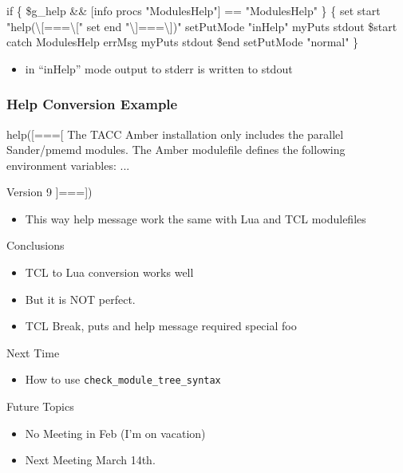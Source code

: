 \documentclass{beamer}
\begin{document}
\begin{frame}[fragile]
    \frametitle{}
 {\tiny
    \begin{semiverbatim}
  if \{ \$g\_help && [info procs "ModulesHelp"] == "ModulesHelp" \} \{
      set start "help(\textbackslash[===\textbackslash["
      set end   "\textbackslash]===\textbackslash])"
      setPutMode "inHelp"
      myPuts stdout \$start
      catch { ModulesHelp } errMsg
      myPuts stdout \$end
      setPutMode "normal"
  \}
    \end{semiverbatim}
}
  \begin{itemize}
    \item in ``inHelp'' mode output to stderr is written to stdout
  \end{itemize}
\end{frame}


\begin{frame}[fragile]
    \frametitle{Help Conversion Example}
 {\tiny
    \begin{semiverbatim}
help([===[
The TACC Amber installation only includes the parallel Sander/pmemd modules.
The Amber modulefile defines the following environment variables: ...

Version 9
]===])
    \end{semiverbatim}
}
  \begin{itemize}
    \item This way help message work the same with Lua and TCL modulefiles
  \end{itemize}

\end{frame}

\begin{frame}{Conclusions}
  \begin{itemize}
    \item TCL to Lua conversion works well 
    \item But it is NOT perfect.
    \item TCL Break, puts and help message required special foo
  \end{itemize}
\end{frame}

\begin{frame}{Next Time}
  \begin{itemize}
    \item How to use \texttt{check\_module\_tree\_syntax}
  \end{itemize}
\end{frame}

\begin{frame}{Future Topics}
  \begin{itemize}
    \item No Meeting in Feb (I'm on vacation)
    \item Next Meeting March 14th.
  \end{itemize}
\end{frame}
\end{document}
